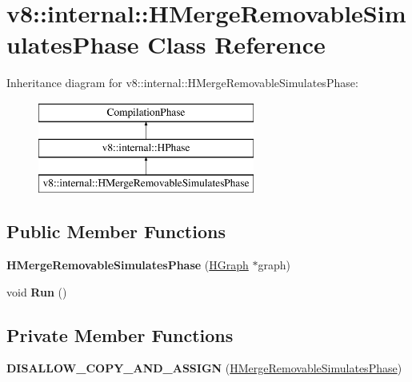 \hypertarget{classv8_1_1internal_1_1_h_merge_removable_simulates_phase}{}\section{v8\+:\+:internal\+:\+:H\+Merge\+Removable\+Simulates\+Phase Class Reference}
\label{classv8_1_1internal_1_1_h_merge_removable_simulates_phase}
Inheritance diagram for v8\+:\+:internal\+:\+:H\+Merge\+Removable\+Simulates\+Phase\+:\begin{figure}[H]
\begin{center}
\leavevmode
\includegraphics[height=3.000000cm]{classv8_1_1internal_1_1_h_merge_removable_simulates_phase}
\end{center}
\end{figure}
\subsection*{Public Member Functions}
\begin{DoxyCompactItemize}
\item 
{\bfseries H\+Merge\+Removable\+Simulates\+Phase} (\hyperlink{classv8_1_1internal_1_1_h_graph}{H\+Graph} $\ast$graph)\hypertarget{classv8_1_1internal_1_1_h_merge_removable_simulates_phase_a0baf5548ff5d8ef6ad932c76bb611e62}{}\label{classv8_1_1internal_1_1_h_merge_removable_simulates_phase_a0baf5548ff5d8ef6ad932c76bb611e62}

\item 
void {\bfseries Run} ()\hypertarget{classv8_1_1internal_1_1_h_merge_removable_simulates_phase_a520b55839ccbf0def14f4799e4b7082b}{}\label{classv8_1_1internal_1_1_h_merge_removable_simulates_phase_a520b55839ccbf0def14f4799e4b7082b}

\end{DoxyCompactItemize}
\subsection*{Private Member Functions}
\begin{DoxyCompactItemize}
\item 
{\bfseries D\+I\+S\+A\+L\+L\+O\+W\+\_\+\+C\+O\+P\+Y\+\_\+\+A\+N\+D\+\_\+\+A\+S\+S\+I\+GN} (\hyperlink{classv8_1_1internal_1_1_h_merge_removable_simulates_phase}{H\+Merge\+Removable\+Simulates\+Phase})\hypertarget{classv8_1_1internal_1_1_h_merge_removable_simulates_phase_a3df7fb8776be9e3030b25499a81e31fa}{}\label{classv8_1_1internal_1_1_h_merge_removable_simulates_phase_a3df7fb8776be9e3030b25499a81e31fa}

\end{DoxyCompactItemize}
